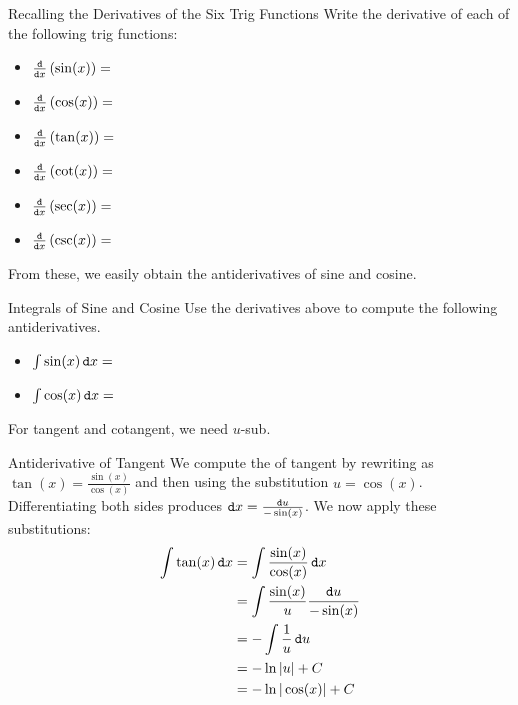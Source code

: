 \begin{exercise}{Recalling the Derivatives of the Six Trig Functions \Coffeecup}
Write the derivative of each of the following trig functions:
\begin{itemize}
\item $\frac{\mathop{}\!\mathtt{d}}{\mathop{}\!\mathtt{d} x}\left(\sin(x) \right)=$
\item $\frac{\mathop{}\!\mathtt{d}}{\mathop{}\!\mathtt{d} x}\left(\cos(x) \right)=$
\item $\frac{\mathop{}\!\mathtt{d}}{\mathop{}\!\mathtt{d} x}\left( \tan(x)\right)=$
\item $\frac{\mathop{}\!\mathtt{d}}{\mathop{}\!\mathtt{d} x}\left( \cot(x)\right)=$
\item $\frac{\mathop{}\!\mathtt{d}}{\mathop{}\!\mathtt{d} x}\left( \sec(x)\right)=$
\item $\frac{\mathop{}\!\mathtt{d}}{\mathop{}\!\mathtt{d} x}\left( \csc(x)\right)=$
\end{itemize}
\end{exercise}

From these, we easily obtain the antiderivatives of sine and cosine.

\begin{exercise}{Integrals of Sine and Cosine \Coffeecup}
Use the derivatives above to compute the following antiderivatives.
\begin{itemize}
\item $\int \sin(x) \mathop{}\!\mathtt{d} x =$
\item $\int \cos(x) \mathop{}\!\mathtt{d} x =$
\end{itemize}
\end{exercise}

For tangent and cotangent, we need $u$-sub.
\begin{example}{Antiderivative of Tangent}
We compute the  of tangent by rewriting as $\tan(x)=\frac{\sin(x)}{\cos(x)}$ and then using the substitution $u=\cos(x)$.  Differentiating both sides produces $\mathop{}\!\mathtt{d} x = \frac{\mathop{}\!\mathtt{d} u}{-\sin(x)}$.  We now apply these substitutions:
\begin{align*}
\int \tan(x) \mathop{}\!\mathtt{d} x &= \int \frac{\sin(x)}{\cos(x)}\mathop{}\!\mathtt{d} x \\ 
&= \int \frac{\sin(x)}{u}\frac{\mathop{}\!\mathtt{d} u}{-\sin(x)} \\
&= -\int \frac{1}{u}\mathop{}\!\mathtt{d} u \\
&= -\ln|u|+C \\
&= -\ln|\cos(x)|+C
\end{align*}
\end{example}


